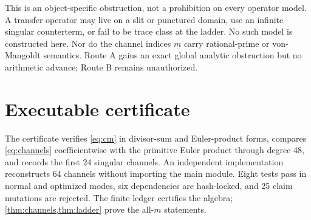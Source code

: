 \documentclass[11pt]{article}
\begin{document}
This is an object-specific obstruction, not a prohibition on every operator
model.  A transfer operator may live on a slit or punctured domain, use an
infinite singular counterterm, or fail to be trace class at the ladder.  No
such model is constructed here.  Nor do the channel indices $m$ carry
rational-prime or von-Mangoldt semantics.  Route A gains an exact global
analytic obstruction but no arithmetic advance; Route B remains
unauthorized.

\section{Executable certificate}

The certificate verifies \eqref{eq:cm} in divisor-sum and Euler-product
forms, compares \eqref{eq:channels} coefficientwise with the primitive
Euler product through degree 48, and records the first 24 singular channels.
An independent implementation reconstructs 64 channels without importing
the main module.  Eight tests pass in normal and optimized modes, six
dependencies are hash-locked, and 25 claim mutations are rejected.  The
finite ledger certifies the algebra; \cref{thm:channels,thm:ladder} prove the
all-$m$ statements.



\end{document}
